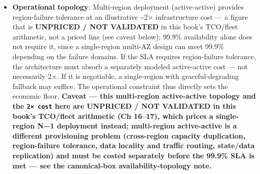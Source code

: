 \begin{itemize}
  (\$0.01164 ÷ \$0.0030 = 3.88). That is a hosted-API figure and says
  nothing directly about fleet capacity. On the \textbf{rented-fleet
  basis} the same input reduction lowers prefill work and the KV
  footprint per request, which changes the host-count screen: a
  2,000-input + 300-output slot costs 2,300 × 2.62 MB ≈ 6.03 GB, so one
  host's 436 GB KV budget holds 436 ÷ 6.03 ≈ 72 slots instead of 17, and
  the KV screen falls to ⌈86 ÷ 72⌉ = 2 hosts at average and ⌈344 ÷ 72⌉ =
  5 at peak; prefill screens at the same counts (10 × 2,000 ÷ 19,800 =
  1.01 → 2, 40 × 2,000 ÷ 19,800 = 4.04 → 5). Those are \emph{analytical
  screens on the planning basis, not capacity results} --- Ch 17
  recomputes them. Compute the cost on the fleet \$/hr ÷ fleet rps
  basis: (5 × \$20/hr) ÷ (40 rps × 3,600 s/hr) ≈ \$0.0007 per request at
  peak, against (21 × \$20/hr) ÷ (40 rps × 3,600 s/hr) ≈ \$0.0029 at
  9.2K input --- not from this \$/request API number. This is the lever
  the architect pulls when TCO is the binding constraint.
\item
  \textbf{Operational topology}: Multi‑region deployment (active‑active)
  provides region-failure tolerance at an illustrative \textasciitilde2×
  infrastructure cost --- a figure that is \textbf{UNPRICED / NOT
  VALIDATED} in this book's TCO/fleet arithmetic, not a priced line (see
  caveat below); 99.9\% availability alone does not require it, since a
  single-region multi-AZ design can meet 99.9\% depending on the failure
  domains. If the SLA requires region-failure tolerance, the
  architecture must absorb a separately modeled active-active cost ---
  not necessarily 2×. If it is negotiable, a single-region with
  graceful-degrading fallback may suffice. The operational constraint
  thus directly sets the economic floor. \textbf{Caveat --- this
  multi-region active-active topology and the \texttt{2×\ cost} here are
  UNPRICED / NOT VALIDATED in this book's TCO/fleet arithmetic (Ch
  16--17), which prices a single-region N−1 deployment instead;
  multi-region active-active is a different provisioning problem
  (cross-region capacity duplication, region-failure tolerance, data
  locality and traffic routing, state/data replication) and must be
  costed separately before the 99.9\% SLA is met --- see the
  canonical-box availability-topology note.}
\end{itemize}

\label{what-we-still-dont-know}


